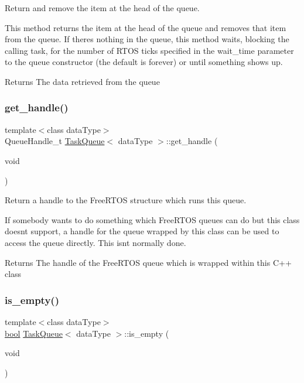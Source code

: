 Return and remove the item at the head of the queue. 

This method returns the item at the head of the queue and removes that item from the queue. If there\textquotesingle{}s nothing in the queue, this method waits, blocking the calling task, for the number of R\+T\+OS ticks specified in the {\ttfamily wait\+\_\+time} parameter to the queue constructor (the default is forever) or until something shows up. \begin{DoxyReturn}{Returns}
The data retrieved from the queue 
\end{DoxyReturn}
\mbox{\label{class_task_queue_a76d88ebf1c89534addd90863cb0a1015}} 
\subsubsection{\texorpdfstring{get\+\_\+handle()}{get\_handle()}}
{\footnotesize\ttfamily template$<$class data\+Type$>$ \\
Queue\+Handle\+\_\+t \mbox{\hyperlink{class_task_queue}{Task\+Queue}}$<$ data\+Type $>$\+::get\+\_\+handle (\begin{DoxyParamCaption}\item[{void}]{ }\end{DoxyParamCaption})\hspace{0.3cm}{\ttfamily [inline]}}



Return a handle to the Free\+R\+T\+OS structure which runs this queue. 

If somebody wants to do something which Free\+R\+T\+OS queues can do but this class doesn\textquotesingle{}t support, a handle for the queue wrapped by this class can be used to access the queue directly. This isn\textquotesingle{}t normally done. \begin{DoxyReturn}{Returns}
The handle of the Free\+R\+T\+OS queue which is wrapped within this C++ class 
\end{DoxyReturn}
\mbox{\label{class_task_queue_a29c1d8b98bcb89d77919ad9ce69320a1}} 
\subsubsection{\texorpdfstring{is\+\_\+empty()}{is\_empty()}}
{\footnotesize\ttfamily template$<$class data\+Type$>$ \\
\mbox{\hyperlink{group___motor___boolean___type_ga0ecf26b576b9a54eca656b9be7ba6a06}{bool}} \mbox{\hyperlink{class_task_queue}{Task\+Queue}}$<$ data\+Type $>$\+::is\+\_\+empty (\begin{DoxyParamCaption}\item[{void}]{ }\end{DoxyParamCaption})\hspace{0.3cm}{\ttfamily [inline]}}



